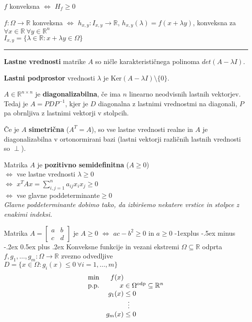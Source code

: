 \documentclass[a4paper,8pt]{extarticle}
\makeatletter
\renewcommand{\subsection}{\@startsection{subsection}{2}{0mm}%
                                {-1explus -.5ex minus -.2ex}%
                                {0.5ex plus .2ex}%
                                {\normalfont\normalsize\bfseries}}
\makeatother
\begin{document}
\begin{multicols}{4}
$f$ konveksna $\iff$ $H_f \geq 0$

$f: \Omega \to \mathbb{R}$ konveksna $\iff$ $h_{x,y}:I_{x,y} \to \mathbb{R}$, $h_{x,y}(\lambda) = f(x+\lambda y)$, konveksna za $\forall x \in \mathbb{R}\ \forall y \in \mathbb{R}^n$\\
$I_{x,y} = \{\lambda \in \mathbb{R} : x+\lambda y \in \Omega\}$

\noindent\rule{2cm}{0.4pt}

\textbf{Lastne vrednosti} matrike $A$ so ničle karakterističnega polinoma $det(A - \lambda I)$.

\textbf{Lastni podprostor} vrednosti $\lambda$ je $\text{Ker}(A-\lambda I) \setminus \{0\}$.

$A \in \mathbb{R}^{n\times n}$ je \textbf{diagonalizabilna}, če ima $n$ linearno neodvisnih lastnih vektorjev. Tedaj je $A = PDP^{-1}$, kjer je $D$ diagonalna z lastnimi vrednostmi na diagonali, $P$ pa obrnljiva z lastnimi vektorji v stolpcih.

Če je $A$ \textbf{simetrična} ($A^T = A$), so vse lastne vrednosti realne in $A$ je diagonalizabilna v ortonormirani bazi (lastni vektorji različnih lastnih vrednosti so $\perp$).

Matrika $A$ je \textbf{pozitivno semidefinitna} ($A \geq 0$) \\
$\iff$ vse lastne vrednosti $\lambda \geq 0$ \\
$\iff$ $x^T A x = \sum_{i,j = 1}^n a_{ij} x_i x_j \geq 0$ \\
$\iff$ vse glavne poddeterminante$\geq 0$ \\

\emph{Glavne poddeterminante dobimo tako, da izbiršemo nekatere vrstice in stolpce z enakimi indeksi.}

Matrika $A = \begin{bmatrix}
	a & b \\
	c & d
\end{bmatrix}$ je $A \geq 0$ $\iff$ $ac - b^2 \geq 0$ in $a \geq 0$
\subsection{Konveksne funkcije in vezani ekstremi}
$\Omega \subseteq \mathbb{R}$ odprta\\
$f, g_1, \dots, g_m : \Omega \to \mathbb{R}$ zvezno odvedljive\\
$D = \{ x \in \Omega: g_i(x) \leq 0\ \forall i = 1,\dots, m\} $\\
\begin{align*}
	\begin{array}{l r@{\;} l} %
		\min 		& f(x)	\\		
		\text{p.p.} & x &\in \Omega^{\text{odp}} \subseteq \mathbb{R}^n \\
		& g_1(x) &\leq 0 \\
		& 									& \  \vdots \\										
		& g_m(x) &\leq 0 \\
	\end{array}
\end{align*}


\end{multicols}
\end{document}
